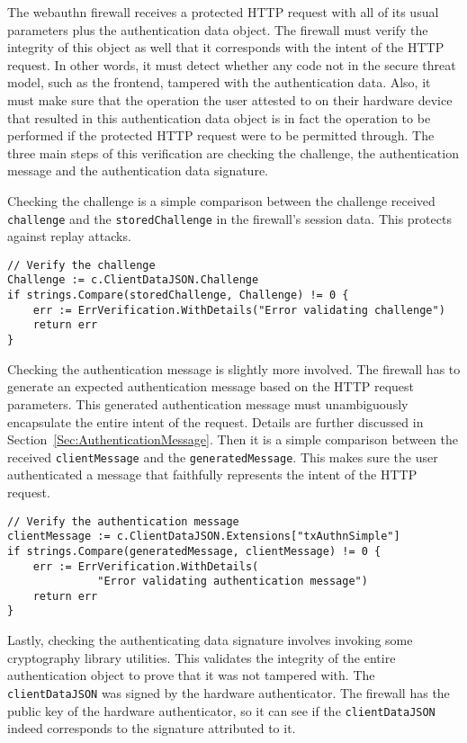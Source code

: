 The webauthn firewall receives a protected HTTP request with all of its usual parameters plus the authentication data object. The firewall must verify the integrity of this object as well that it corresponds with the intent of the HTTP request. In other words, it must detect whether any code not in the secure threat model, such as the frontend, tampered with the authentication data. Also, it must make sure that the operation the user attested to on their hardware device that resulted in this authentication data object is in fact the operation to be performed if the protected HTTP request were to be permitted through. The three main steps of this verification are checking the challenge, the authentication message and the authentication data signature.

Checking the challenge is a simple comparison between the challenge received \lstinline{challenge} and the \lstinline{storedChallenge} in the firewall's session data. This protects against replay attacks.

\begin{lstlisting}
// Verify the challenge
Challenge := c.ClientDataJSON.Challenge
if strings.Compare(storedChallenge, Challenge) != 0 {
	err := ErrVerification.WithDetails("Error validating challenge")
	return err
}
\end{lstlisting}

Checking the authentication message is slightly more involved. The firewall has to generate an expected authentication message based on the HTTP request parameters. This generated authentication message must unambiguously encapsulate the entire intent of the request. Details are further discussed in Section~\ref{Sec:AuthenticationMessage}. Then it is a simple comparison between the received \lstinline{clientMessage} and the \lstinline{generatedMessage}. This makes sure the user authenticated a message that faithfully represents the intent of the HTTP request.

\begin{lstlisting}
// Verify the authentication message
clientMessage := c.ClientDataJSON.Extensions["txAuthnSimple"]
if strings.Compare(generatedMessage, clientMessage) != 0 {
	err := ErrVerification.WithDetails(
              "Error validating authentication message")
	return err
}
\end{lstlisting}

Lastly, checking the authenticating data signature involves invoking some cryptography library utilities. This validates the integrity of the entire authentication object to prove that it was not tampered with. The \lstinline{clientDataJSON} was signed by the hardware authenticator. The firewall has the public key of the hardware authenticator, so it can see if the \lstinline{clientDataJSON} indeed corresponds to the signature attributed to it.


